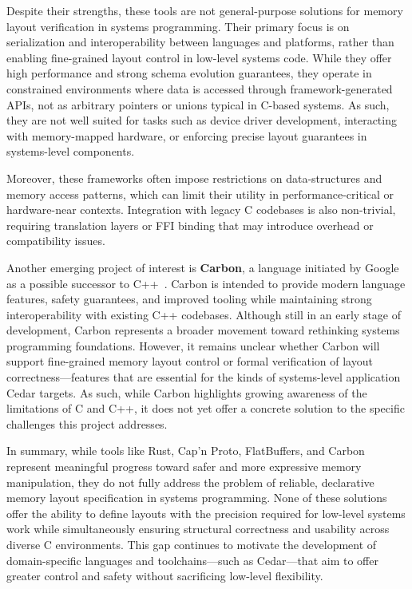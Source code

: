 \documentclass[12pt]{article}
\begin{document}
Despite their strengths, these tools are not general-purpose solutions for
memory layout verification in systems programming. Their primary focus is on
serialization and interoperability between languages and platforms, rather than
enabling fine-grained layout control in low-level systems code. While they offer
high performance and strong schema evolution guarantees, they operate in constrained
environments where data is accessed through framework-generated APIs, not as
arbitrary pointers or unions typical in C-based systems. As such, they are not
well suited for tasks such as device driver development, interacting with 
memory-mapped hardware, or enforcing precise layout guarantees in systems-level 
components.

Moreover, these frameworks often impose restrictions on data-structures and memory
access patterns, which can limit their utility in performance-critical or
hardware-near contexts. Integration with legacy C codebases is also non-trivial,
requiring translation layers or FFI binding that may introduce overhead or
compatibility issues.

Another emerging project of interest is \textbf{Carbon}, a language initiated
by Google as a possible successor to C++~\autocite{carbon_cpp_safety}.
Carbon is intended to provide modern
language features, safety guarantees, and improved tooling while maintaining
strong interoperability with existing C++ codebases. Although still in an early
stage of development, Carbon represents a broader movement toward
rethinking systems programming foundations. However, it remains unclear
whether Carbon will support fine-grained memory layout control or formal
verification of layout correctness---features that are essential for the kinds
of systems-level application Cedar targets. As such, while Carbon highlights
growing awareness of the limitations of C and C++, it does not yet offer
a concrete solution to the specific challenges this project addresses.

In summary, while tools like Rust, Cap'n Proto, FlatBuffers, and Carbon
represent meaningful progress toward safer and more expressive memory
manipulation, they do not fully address the problem of reliable, declarative memory
layout specification in systems programming. None of these solutions
offer the ability to define layouts with the precision required for low-level
systems work while simultaneously ensuring structural correctness and usability 
across diverse C environments. This gap continues to motivate the development of
domain-specific languages and toolchains---such as Cedar---that aim to offer
greater control and safety without sacrificing low-level flexibility.
\end{document}
